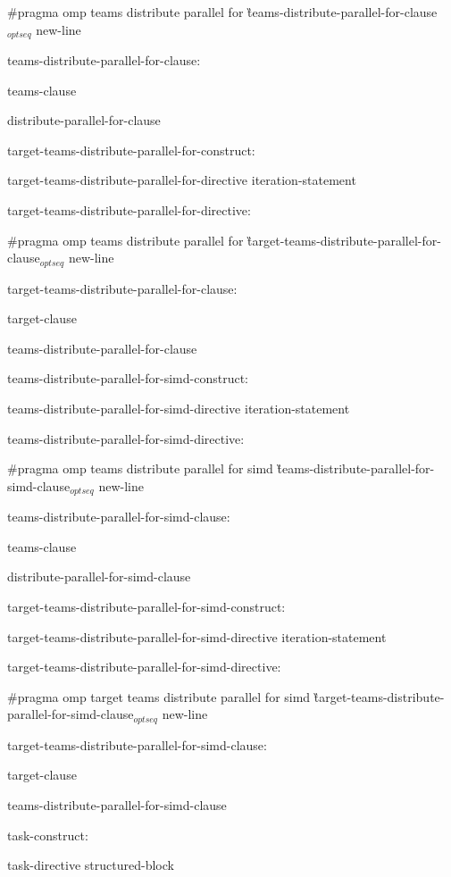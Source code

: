 {\C\I\I \#pragma omp teams distribute parallel for \G teams-distribute-parallel-for-clause$_{optseq}$ new-line

\I teams-distribute-parallel-for-clause:

\I\I teams-clause

\I\I distribute-parallel-for-clause

\I target-teams-distribute-parallel-for-construct:

\I\I target-teams-distribute-parallel-for-directive iteration-statement

\I target-teams-distribute-parallel-for-directive:

\C\I\I \#pragma omp teams distribute parallel for \G target-teams-distribute-parallel-for-clause$_{optseq}$ new-line

\I target-teams-distribute-parallel-for-clause:

\I\I target-clause

\I\I teams-distribute-parallel-for-clause

\I teams-distribute-parallel-for-simd-construct:

\I\I teams-distribute-parallel-for-simd-directive iteration-statement

\I teams-distribute-parallel-for-simd-directive:

\C\I \#pragma omp teams distribute parallel for simd \G teams-distribute-parallel-for-simd-clause$_{optseq}$ new-line

\I teams-distribute-parallel-for-simd-clause:

\I\I teams-clause

\I\I distribute-parallel-for-simd-clause

\I target-teams-distribute-parallel-for-simd-construct:

\I\I target-teams-distribute-parallel-for-simd-directive iteration-statement

\I target-teams-distribute-parallel-for-simd-directive:

\C\I\I \#pragma omp target teams distribute parallel for simd \G target-teams-distribute-parallel-for-simd-clause$_{optseq}$ new-line

\I target-teams-distribute-parallel-for-simd-clause:

\I\I target-clause

\I\I teams-distribute-parallel-for-simd-clause

\I task-construct:

\I\I task-directive structured-block

}
